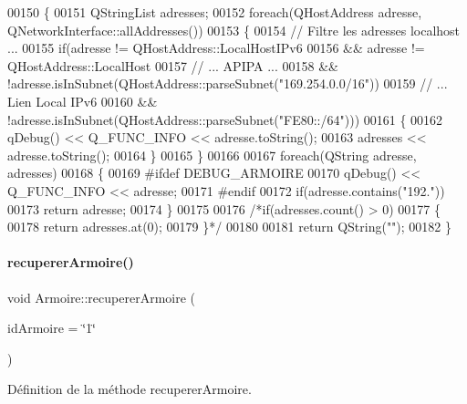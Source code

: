 \begin{DoxyCode}
00150 \{
00151     QStringList adresses;
00152     \textcolor{keywordflow}{foreach}(QHostAddress adresse, QNetworkInterface::allAddresses())
00153     \{
00154         \textcolor{comment}{// Filtre les adresses localhost ...}
00155         \textcolor{keywordflow}{if}(adresse != QHostAddress::LocalHostIPv6
00156            && adresse != QHostAddress::LocalHost
00157            \textcolor{comment}{// ... APIPA ...}
00158            && !adresse.isInSubnet(QHostAddress::parseSubnet(\textcolor{stringliteral}{"169.254.0.0/16"}))
00159            \textcolor{comment}{// ... Lien Local IPv6}
00160            && !adresse.isInSubnet(QHostAddress::parseSubnet(\textcolor{stringliteral}{"FE80::/64"})))
00161         \{
00162             qDebug() << Q\_FUNC\_INFO << adresse.toString();
00163             adresses << adresse.toString();
00164         \}
00165     \}
00166 
00167     \textcolor{keywordflow}{foreach}(QString adresse, adresses)
00168     \{
00169 \textcolor{preprocessor}{        #ifdef DEBUG\_ARMOIRE}
00170             qDebug() << Q\_FUNC\_INFO << adresse;
00171 \textcolor{preprocessor}{        #endif}
00172         \textcolor{keywordflow}{if}(adresse.contains(\textcolor{stringliteral}{"192."}))
00173             \textcolor{keywordflow}{return} adresse;
00174     \}
00175 
00176     \textcolor{comment}{/*if(adresses.count() > 0)}
00177 \textcolor{comment}{    \{}
00178 \textcolor{comment}{        return adresses.at(0);}
00179 \textcolor{comment}{    \}*/}
00180 
00181     \textcolor{keywordflow}{return} QString(\textcolor{stringliteral}{""});
00182 \}
\end{DoxyCode}
\mbox{\label{class_armoire_a1c5266f9e4b01c0d2e1d244d2f11fffd}} 
\paragraph{\texorpdfstring{recuperer\+Armoire()}{recupererArmoire()}}
{\footnotesize\ttfamily void Armoire\+::recuperer\+Armoire (\begin{DoxyParamCaption}\item[{Q\+String}]{id\+Armoire = {\ttfamily \char`\"{}1\char`\"{}} }\end{DoxyParamCaption})}



Définition de la méthode recuperer\+Armoire. 

